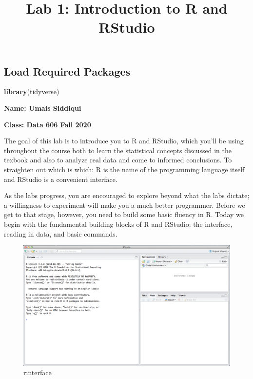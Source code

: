 \documentclass[
]{article}
\title{Lab 1: Introduction to R and RStudio}
\author{}
\date{\vspace{-2.5em}}
\newenvironment{Shaded}{\begin{snugshade}}{\end{snugshade}}
\newcommand{\KeywordTok}[1]{\textcolor[rgb]{0.13,0.29,0.53}{\textbf{#1}}}
\newcommand{\NormalTok}[1]{#1}
\begin{document}
\maketitle

\hypertarget{load-required-packages}{%
\subsection{Load Required Packages}\label{load-required-packages}}

\begin{Shaded}
\begin{Highlighting}[]
\KeywordTok{library}\NormalTok{(tidyverse)}
\end{Highlighting}
\end{Shaded}

\textbf{Name: Umais Siddiqui}

\textbf{Class: Data 606 Fall 2020}

The goal of this lab is to introduce you to R and RStudio, which you'll
be using throughout the course both to learn the statistical concepts
discussed in the texbook and also to analyze real data and come to
informed conclusions. To straighten out which is which: R is the name of
the programming language itself and RStudio is a convenient interface.

As the labs progress, you are encouraged to explore beyond what the labs
dictate; a willingness to experiment will make you a much better
programmer. Before we get to that stage, however, you need to build some
basic fluency in R. Today we begin with the fundamental building blocks
of R and RStudio: the interface, reading in data, and basic commands.

\begin{figure}
\centering
\includegraphics{more/rInterface2014.png}
\caption{rinterface}
\end{figure}
\end{document}
